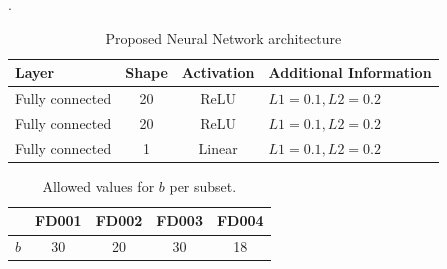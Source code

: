 \documentclass[12pt]{IEEEtran}%
\begin{document}
\begin{table}
\begin{center}
\caption{Proposed Neural Network architecture}.%
%

\begin{tabular}
[c]{llll}\hline
Layer & Shape & Activation & Additional Information\\\hline\hline
Fully connected & \multicolumn{1}{c}{20} & \multicolumn{1}{c}{ReLU} &
$L1=0.1,L2=0.2$\\
Fully connected & \multicolumn{1}{c}{20} & \multicolumn{1}{c}{ReLU} &
$L1=0.1,L2=0.2$\\
Fully connected & \multicolumn{1}{c}{1} & \multicolumn{1}{c}{Linear} &
$L1=0.1,L2=0.2$\\\hline
\end{tabular}
\label{table:proposed_nn}%

\end{center}
\end{table}%
%

\begin{table}
\begin{center}
\caption{Allowed values for $b$ per subset.}%
%

\begin{tabular}
[c]{c|cccc}\hline
& FD001 & FD002 & FD003 & FD004\\\hline
$b$ & 30 & 20 & 30 & 18\\\hline
\end{tabular}
\label{table:b_values}%

\end{center}
\end{table}%
%
\end{document}
